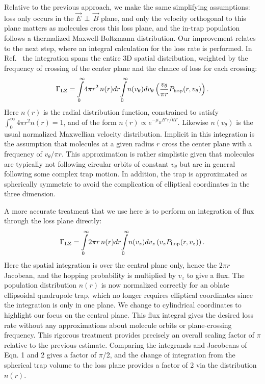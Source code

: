 \documentclass[%
 reprint,
 amsmath,amssymb,
 aps,
prl,
]{revtex4-1}
\newcommand{\epb}{{$\vec{E}\,{\perp}\,\vec{B}$}}
\begin{document}
Relative to the previous approach, we make the same simplifying assumptions: loss only occurs in the \epb{} plane, and only the velocity orthogonal to this plane matters as molecules cross this loss plane, and the in-trap population follows a thermalized Maxwell-Boltzmann distribution.
Our improvement relates to the next step, where an integral calculation for the loss rate is performed.
In Ref.~\cite{Stuhl2013} the integration spans the entire 3D spatial distribution, weighted by the frequency of crossing of the center plane and the chance of loss for each crossing:
\begin{equation}
\Gamma_\text{LZ}=\int\displaylimits_0^\infty\!4\pi r^2\,n(r)dr\!\int\displaylimits_0^\infty \!n(v_\theta)dv_\theta\left( \frac{v_\theta}{\pi r} P_\text{hop}(r,v_\theta)\right).
\end{equation}
Here $n(r)$ is the radial distribution function, constrained to satisfy $\int_0^\infty 4\pi r^2n(r)=1$, and of the form $n(r)\propto e^{-\mu_BB' r/kT}$. Likewise $n(v_\theta)$ is the usual normalized Maxwellian velocity distribution.  Implicit in this integration is the assumption that molecules at a given radius $r$ cross the center plane with a frequency of $v_\theta/\pi r$.
This approximation is rather simplistic given that molecules are typically not following circular orbits of constant $v_\theta$ but are in general following some complex trap motion. In addition, the trap is approximated as spherically symmetric to avoid the complication of elliptical coordinates in the three dimension.

A more accurate treatment that we use here is to perform an integration of flux through the loss plane directly:
\begin{equation}
\Gamma_\text{LZ}=\int\displaylimits_0^\infty\!2\pi r \,n(r)dr\!\int\displaylimits_0^\infty\! n(v_z)dv_z\left(v_z P_\text{hop}(r,v_z)\right).
\end{equation}
Here the spatial integration is over the central plane only, hence the $2\pi r$ Jacobean, and the hopping probability is multiplied by $v_z$ to give a flux. The population distribution $n(r)$ is now normalized correctly for an oblate ellipsoidal quadrupole trap, which no longer requires elliptical coordinates since the integration is only in one plane. We change to cylindrical coordinates to highlight our focus on the central plane.
This flux integral gives the desired loss rate without any approximations about molecule orbits or plane-crossing frequency. This rigorous treatment provides precisely an overall scaling factor of $\pi$ relative to the previous estimate. Comparing the integrands and Jacobeans of Eqn. 1 and 2 gives a factor of $\pi$/2, and the change of integration from the spherical trap volume to the loss plane provides a factor of 2 via the distribution $n(r)$.
\end{document}
